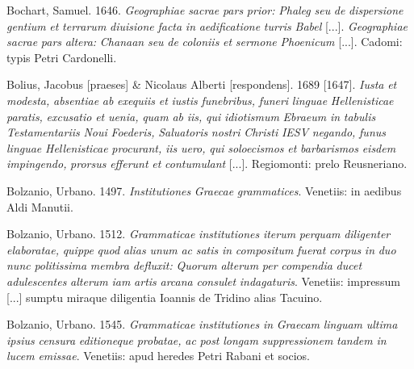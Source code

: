 Bochart, Samuel. 1646. \textit{Geographiae} \textit{sacrae} \textit{pars} \textit{prior:} \textit{Phaleg} \textit{seu} \textit{de} \textit{dispersione} \textit{gentium} \textit{et} \textit{terrarum} \textit{diuisione} \textit{facta} \textit{in} \textit{aedificatione} \textit{turris} \textit{Babel} [...]. \textit{Geographiae} \textit{sacrae} \textit{pars} \textit{altera:} \textit{Chanaan} \textit{seu} \textit{de} \textit{coloniis} \textit{et} \textit{sermone} \textit{Phoenicum} [...]. Cadomi: typis Petri Cardonelli.

Bolius, Jacobus [praeses] \& Nicolaus Alberti [respondens]. 1689 [1647]. \textit{Iusta} \textit{et} \textit{modesta,} \textit{absentiae} \textit{ab} \textit{exequiis} \textit{et} \textit{iustis} \textit{funebribus,} \textit{funeri} \textit{linguae} \textit{Hellenisticae} \textit{paratis,} \textit{excusatio} \textit{et} \textit{uenia,} \textit{quam} \textit{ab} \textit{iis,} \textit{qui} \textit{idiotismum} \textit{Ebraeum} \textit{in} \textit{tabulis} \textit{Testamentariis} \textit{Noui} \textit{Foederis,} \textit{Saluatoris} \textit{nostri} \textit{Christi} \textit{IESV} \textit{negando,} \textit{funus} \textit{linguae} \textit{Hellenisticae} \textit{procurant,} \textit{iis} \textit{uero,} \textit{qui} \textit{soloecismos} \textit{et} \textit{barbarismos} \textit{eisdem} \textit{impingendo,} \textit{prorsus} \textit{efferunt} \textit{et} \textit{contumulant} [...]. Regiomonti: prelo Reusneriano.

Bolzanio, Urbano. 1497. \textit{Institutiones} \textit{Graecae} \textit{grammatices}. Venetiis: in aedibus Aldi Manutii.

Bolzanio, Urbano. 1512. \textit{Grammaticae} \textit{institutiones} \textit{iterum} \textit{perquam} \textit{diligenter} \textit{elaboratae,} \textit{quippe} \textit{quod} \textit{alias} \textit{unum} \textit{ac} \textit{satis} \textit{in} \textit{compositum} \textit{fuerat} \textit{corpus} \textit{in} \textit{duo} \textit{nunc} \textit{politissima} \textit{membra} \textit{defluxit:} \textit{Quorum} \textit{alterum} \textit{per} \textit{compendia} \textit{ducet} \textit{adulescentes} \textit{alterum} \textit{iam} \textit{artis} \textit{arcana} \textit{consulet} \textit{indagaturis}. Venetiis: impressum [...] sumptu miraque diligentia Ioannis de Tridino alias Tacuino.

Bolzanio, Urbano. 1545. \textit{Grammaticae} \textit{institutiones} \textit{in} \textit{Graecam} \textit{linguam} \textit{ultima} \textit{ipsius} \textit{censura} \textit{editioneque} \textit{probatae,} \textit{ac} \textit{post} \textit{longam} \textit{suppressionem} \textit{tandem} \textit{in} \textit{lucem} \textit{emissae}. Venetiis: apud heredes Petri Rabani et socios.

